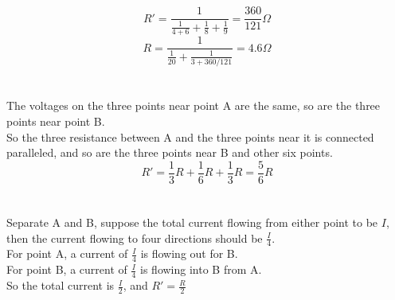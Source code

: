 \documentclass{article}
\begin{document}
\section{}
$$R'=\frac{1}{\frac{1}{4+6}+\frac{1}{8}+\frac{1}{9}}=\frac{360}{121}\Omega$$
$$R=\frac{1}{\frac{1}{20}+\frac{1}{3+360/121}}=4.6\Omega$$

\section{}
The voltages on the three points near point A are the same, so are the three points near point B.\\
So the three resistance between A and the three points near it is connected paralleled, and so are the three points near B and other six points.
$$R'=\frac{1}{3}R+\frac{1}{6}R+\frac{1}{3}R=\frac{5}{6}R$$

\section{}
Separate A and B, suppose the total current flowing from either point to be $I$, then the current flowing to four directions should be $\frac{I}{4}$.\\
For point A, a current of $\frac{I}{4}$ is flowing out for B.\\
For point B, a current of $\frac{I}{4}$ is flowing into B from A.\\
So the total current is $\frac{I}{2}$, and $R'=\frac{R}{2}$
\end{document}
